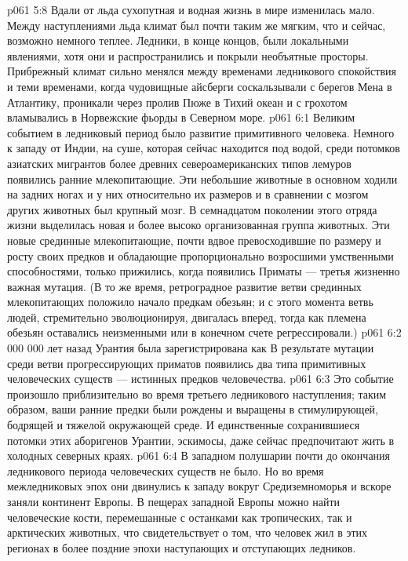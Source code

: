 \vs p061 5:8 Вдали от льда сухопутная и водная жизнь в мире изменилась мало. Между наступлениями льда климат был почти таким же мягким, что и сейчас, возможно немного теплее. Ледники, в конце концов, были локальными явлениями, хотя они и распространились и покрыли необъятные просторы. Прибрежный климат сильно менялся между временами ледникового спокойствия и теми временами, когда чудовищные айсберги соскальзывали с берегов Мена в Атлантику, проникали через пролив Пюже в Тихий океан и с грохотом вламывались в Норвежские фьорды в Северном море.
\vs p061 6:1 Великим событием в ледниковый период было развитие примитивного человека. Немного к западу от Индии, на суше, которая сейчас находится под водой, среди потомков азиатских мигрантов более древних североамериканских типов лемуров  появились ранние млекопитающие. Эти небольшие животные в основном ходили на задних ногах и у них относительно их размеров и в сравнении с мозгом других животных был крупный мозг. В семнадцатом поколении этого отряда жизни  выделилась новая и более высоко организованная группа животных. Эти новые срединные млекопитающие, почти вдвое превосходившие по размеру и росту своих предков и обладающие пропорционально возросшими умственными способностями, только прижились, когда  появились Приматы --- третья жизненно важная мутация. (В то же время, ретроградное развитие ветви срединных млекопитающих положило начало предкам обезьян; и с этого момента ветвь людей, стремительно эволюционируя, двигалась вперед, тогда как племена обезьян оставались неизменными или в конечном счете регрессировали.)
\vs p061 6:2  000 000 лет назад Урантия была зарегистрирована как  В результате мутации среди ветви прогрессирующих приматов  появились два типа примитивных человеческих существ --- истинных предков человечества.
\vs p061 6:3 Это событие произошло приблизительно во время третьего ледникового наступления; таким образом, ваши ранние предки были рождены и выращены в стимулирующей, бодрящей и тяжелой окружающей среде. И единственные сохранившиеся потомки этих аборигенов Урантии, эскимосы, даже сейчас предпочитают жить в холодных северных краях.
\vs p061 6:4 \pc В западном полушарии почти до окончания ледникового периода человеческих существ не было. Но во время межледниковых эпох они двинулись к западу вокруг Средиземноморья и вскоре заняли континент Европы. В пещерах западной Европы можно найти человеческие кости, перемешанные с останками как тропических, так и арктических животных, что свидетельствует о том, что человек жил в этих регионах в более поздние эпохи наступающих и отступающих ледников.
